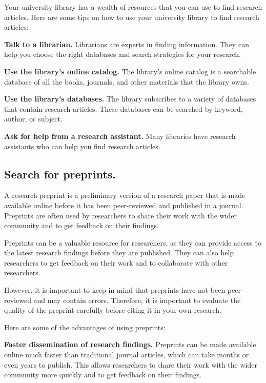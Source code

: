 \documentclass[
]{book}
\begin{document}
Your university library has a wealth of resources that you can use to find research articles. Here are some tips on how to use your university library to find research articles:

\textbf{Talk to a librarian.} Librarians are experts in finding information. They can help you choose the right databases and search strategies for your research.

\textbf{Use the library's online catalog.} The library's online catalog is a searchable database of all the books, journals, and other materials that the library owns.

\textbf{Use the library's databases.} The library subscribes to a variety of databases that contain research articles. These databases can be searched by keyword, author, or subject.

\textbf{Ask for help from a research assistant.} Many libraries have research assistants who can help you find research articles.

\hypertarget{search-for-preprints.}{%
\subsection*{Search for preprints.}\label{search-for-preprints.}}

A research preprint is a preliminary version of a research paper that is made available online before it has been peer-reviewed and published in a journal. Preprints are often used by researchers to share their work with the wider community and to get feedback on their findings.

Preprints can be a valuable resource for researchers, as they can provide access to the latest research findings before they are published. They can also help researchers to get feedback on their work and to collaborate with other researchers.

However, it is important to keep in mind that preprints have not been peer-reviewed and may contain errors. Therefore, it is important to evaluate the quality of the preprint carefully before citing it in your own research.

Here are some of the advantages of using preprints:

\textbf{Faster dissemination of research findings.} Preprints can be made available online much faster than traditional journal articles, which can take months or even years to publish. This allows researchers to share their work with the wider community more quickly and to get feedback on their findings.
\end{document}
